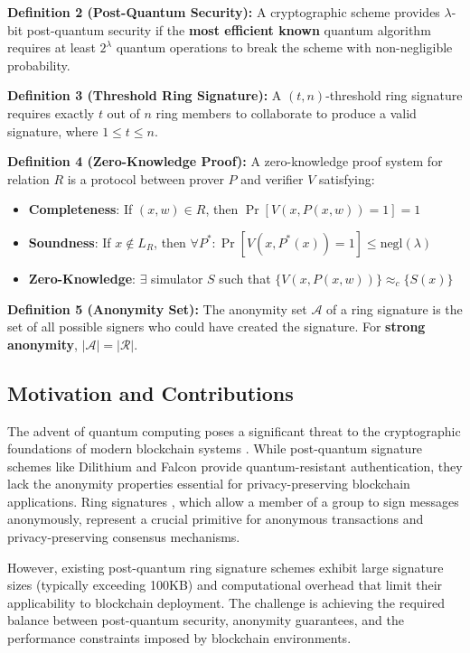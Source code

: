 \documentclass[11pt,a4paper]{article}
\begin{document}
\textbf{Definition 2 (Post-Quantum Security):} A cryptographic scheme provides $\lambda$-bit post-quantum security if the \textbf{most efficient known} quantum algorithm requires at least $2^\lambda$ quantum operations to break the scheme with non-negligible probability.

\textbf{Definition 3 (Threshold Ring Signature):} A $(t,n)$-threshold ring signature requires exactly $t$ out of $n$ ring members to collaborate to produce a valid signature, where $1 \leq t \leq n$.

\textbf{Definition 4 (Zero-Knowledge Proof):} A zero-knowledge proof system for relation $R$ is a protocol between prover $P$ and verifier $V$ satisfying:
\begin{itemize}
\item \textbf{Completeness}: If $(x,w) \in R$, then $\Pr[V(x,P(x,w))=1] = 1$
\item \textbf{Soundness}: If $x \notin L_R$, then $\forall P^*: \Pr[V(x,P^*(x))=1] \leq \text{negl}(\lambda)$
\item \textbf{Zero-Knowledge}: $\exists$ simulator $S$ such that $\{V(x,P(x,w))\} \approx_c \{S(x)\}$
\end{itemize}

\textbf{Definition 5 (Anonymity Set):} The anonymity set $\mathcal{A}$ of a ring signature is the set of all possible signers who could have created the signature. For \textbf{strong anonymity}, $|\mathcal{A}| = |\mathcal{R}|$.

\subsection{Motivation and Contributions}

The advent of quantum computing poses a significant threat to the cryptographic foundations of modern blockchain systems \cite{shor1997, grover1996}. While post-quantum signature schemes like Dilithium \cite{dilithium2021} and Falcon \cite{falcon2020} provide quantum-resistant authentication, they lack the anonymity properties essential for privacy-preserving blockchain applications. Ring signatures \cite{rivest2001}, which allow a member of a group to sign messages anonymously, represent a crucial primitive for anonymous transactions and privacy-preserving consensus mechanisms.

However, existing post-quantum ring signature schemes exhibit large signature sizes (typically exceeding 100KB) and computational overhead that limit their applicability to blockchain deployment. The challenge is achieving the required balance between post-quantum security, anonymity guarantees, and the performance constraints imposed by blockchain environments.
\end{document}

